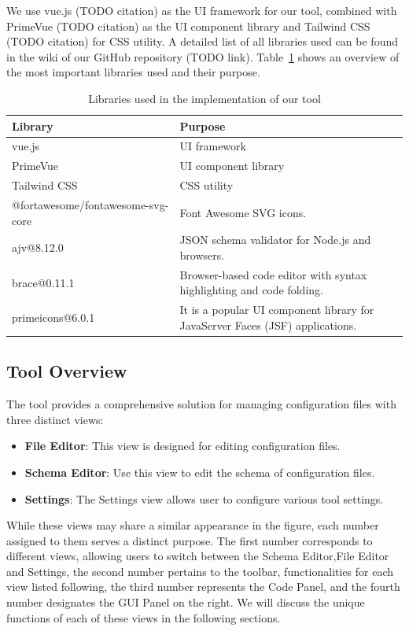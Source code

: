 We use vue.js (TODO citation) as the UI framework for our tool, combined with PrimeVue (TODO citation) as the UI component library and Tailwind CSS (TODO citation) for CSS utility.
A detailed list of all libraries used can be found in the wiki of our GitHub repository (TODO link).
Table~\ref{tab:libraries} shows an overview of the most important libraries used and their purpose.

\begin{table}[!t] %
    \caption{Libraries used in the implementation of our tool}
    \label{tab:libraries}
    \centering
    \begin{tabular}{ll}
        \toprule
        \textbf{Library} & \textbf{Purpose}     \\
        \midrule
        vue.js           & UI framework         \\
        PrimeVue         & UI component library \\
        Tailwind CSS     & CSS utility          \\
        @fortawesome/fontawesome-svg-core & Font Awesome SVG icons. \\
        ajv@8.12.0 & JSON schema validator for Node.js and browsers. \\
        brace@0.11.1 & Browser-based code editor with syntax highlighting and code folding. \\
        primeicons@6.0.1 & It is a popular UI component library for JavaServer Faces (JSF) applications. \\
        \bottomrule
    \end{tabular}
\end{table}

\subsection{Tool Overview}\label{subsec:tool-overview} %


The tool provides a comprehensive solution for managing configuration files with three distinct views:
\begin{itemize}
    \item \textbf{File Editor}: This view is designed for editing configuration files.
    \item \textbf{Schema Editor}: Use this view to edit the schema of configuration files.
    \item \textbf{Settings}: The Settings view allows user to configure various tool settings.
\end{itemize}
While these views may share a similar appearance in the figure, each number assigned to them serves a distinct purpose. The first number corresponds to different views, allowing users to switch between the Schema Editor,File Editor and Settings, the second number pertains to the toolbar, functionalities for each view listed following, the third number represents the Code Panel, and the fourth number designates the GUI Panel on the right. We will discuss the unique functions of each of these views in the following sections.

